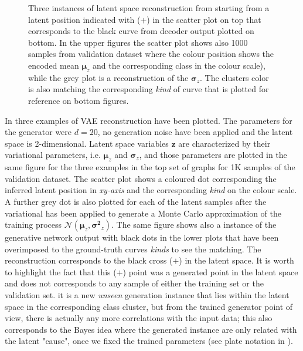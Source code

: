 \begin{figure}
    \caption{ Three instances of latent space reconstruction from  starting from a latent position indicated with ($\bm{+}$) in the scatter plot on top that corresponds to the black curve from decoder output plotted on bottom. In the upper figures the scatter plot shows also 1000 samples from validation dataset where the colour position shows the encoded mean $\bm{\mu}_z$ and the corresponding class in the colour scale), while the grey plot is a reconstruction of the $\bm{\sigma}_z$. The clusters color is also matching the corresponding \textit{kind} of curve that is plotted for reference on bottom figures.} 
    \label{fig:step_1}
\end{figure}
%
In \Figure{\ref{fig:step_1}} three examples of \acs{VAE} reconstruction have been plotted. The parameters for the generator were $d=20$, no generation noise have been applied and the latent space is 2-dimensional. Latent space variables $\bm{z}$ are characterized by their variational parameters, i.e. $\bm{\mu}_z$ and $\bm{\sigma}_z$, and those parameters are plotted in the same figure for the three examples in the top set of graphs for 1K samples of the validation dataset. The scatter plot shows a coloured dot corresponding  the inferred latent position in \textit{xy-axis} and the corresponding \textit{kind} on the colour scale. A further grey dot is also plotted for each of the latent samples after the variational has been applied to generate a Monte Carlo approximation of the training process $\mathcal{N}(\bm{\mu}_z, \bm{\sigma^2}_z)$.
The same figure shows also a instance of the generative network output with black dots in the lower plots that have been overimposed to the ground-truth curves \textit{kinds} to see the matching. The reconstruction corresponds to the black cross ($\bm{+}$) in the latent space. It is worth to highlight the fact that this ($\bm{+}$) point was a generated point in the latent space and does not corresponds to any sample of either the training set or the validation set. it is a new \textit{unseen} generation instance that lies within the latent space in the corresponding class cluster, but from the trained generator point of view, there is actually any more correlations with the input data; this also corresponds to the Bayes idea where the generated instance are only related with the latent "cause", once we fixed the trained parameters (see plate notation in \Figure{\ref{fig:step1_vae_plate}}).
